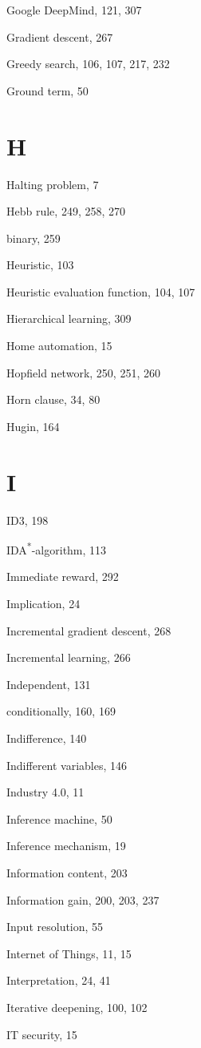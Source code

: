 \documentclass[10pt]{book}
\begin{document}
Google DeepMind, 121, 307

Gradient descent, 267

Greedy search, 106, 107, 217, 232

Ground term, 50

\section{H}

Halting problem, 7

Hebb rule, 249, 258, 270

binary, 259

Heuristic, 103

Heuristic evaluation function, 104, 107

Hierarchical learning, 309

Home automation, 15

Hopfield network, 250, 251, 260

Horn clause, 34, 80

Hugin, 164

\section{I}

ID3, 198

IDA\textsuperscript{*}-algorithm, 113

Immediate reward, 292

Implication, 24

Incremental gradient descent, 268

Incremental learning, 266

Independent, 131

conditionally, 160, 169

Indifference, 140

Indifferent variables, 146

Industry 4.0, 11

Inference machine, 50

Inference mechanism, 19

Information content, 203

Information gain, 200, 203, 237

Input resolution, 55

Internet of Things, 11, 15

Interpretation, 24, 41

Iterative deepening, 100, 102

IT security, 15
\end{document}
